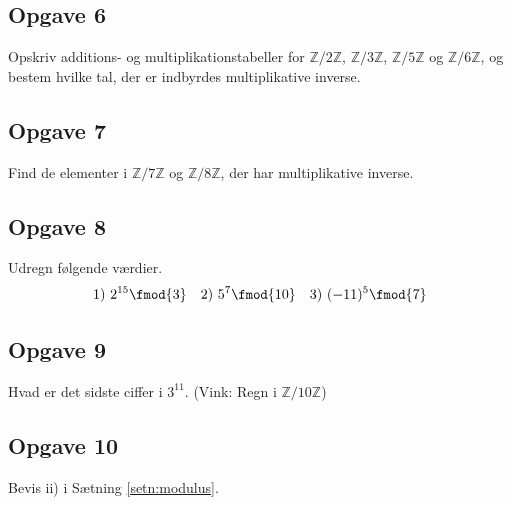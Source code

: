 \subsection*{Opgave 6}
Opskriv additions- og multiplikationstabeller for $\mathbb{Z}/2\mathbb{Z}$, $\mathbb{Z}/3\mathbb{Z}$,
$\mathbb{Z}/5\mathbb{Z}$ og $\mathbb{Z}/6\mathbb{Z}$, og bestem hvilke tal, der er indbyrdes multiplikative inverse.

\subsection*{Opgave 7}
Find de elementer i $\mathbb{Z}/7\mathbb{Z}$ og $\mathbb{Z}/8\mathbb{Z}$, der har multiplikative inverse. 

\subsection*{Opgave 8}
Udregn følgende værdier. 
\begin{align*}
	&1) \ 2^{15} \fmod{3} & &2) \ 5^7 \fmod{10} & &3) \ (-11)^5 \fmod{7} \\
\end{align*}

\subsection*{Opgave 9}
Hvad er det sidste ciffer i $3^{11}$. (Vink: Regn i  $\mathbb{Z}/10\mathbb{Z}$)

\subsection*{Opgave 10}
Bevis ii) i Sætning \ref{setn:modulus}.
